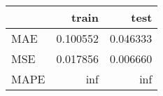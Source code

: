 \begin{tabular}{lrr}
\toprule
{} &     train &      test \\
\midrule
MAE  &  0.100552 &  0.046333 \\
MSE  &  0.017856 &  0.006660 \\
MAPE &       inf &       inf \\
\bottomrule
\end{tabular}
